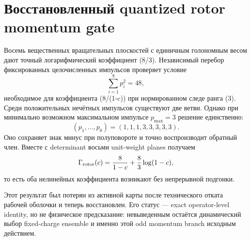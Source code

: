 \chapter{Восстановленный quantized rotor momentum gate}

Восемь вещественных вращательных плоскостей с единичным голономным весом
дают точный логарифмический коэффициент (8/3). Независимый перебор
фиксированных целочисленных импульсов проверяет условие
\[
 \sum_{i=1}^{8}p_i^2=48,
\]
необходимое для коэффициента (8/(1-c)) при нормированном следе ранга (3).
Среди положительных нечётных импульсов существуют две ветви. Однако при
минимально возможном максимальном импульсе \(p_{\max}=3\) решение единственно:
\[
 (p_1,\ldots,p_8)=(1,1,1,3,3,3,3,3).
\]
Оно сохраняет знак минус при полуповороте и точно воспроизводит обратный
член. Вместе с determinant восьми unit-weight planes получаем
\[
 \Gamma_{\rm rotor}(c)
 =\frac8{1-c}+\frac83\log(1-c),
\]
то есть оба нелинейных коэффициента возникают без непрерывной подгонки.

Этот результат был потерян из активной карты после технического отката
рабочей оболочки и теперь восстановлен. Его статус --- exact operator-level
identity, но не физическое предсказание: невыведенным остаётся динамический
выбор fixed-charge ensemble и именно этой odd momentum branch исходным
действием.